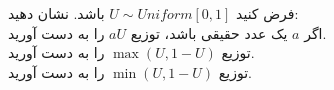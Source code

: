 \problem{}
فرض کنید \( U \sim {Uniform}[0, 1] \) باشد. نشان دهید:
\\
[5pt]
\subproblem{}
اگر \( a \) یک عدد حقیقی باشد، توزیع \( a U \) را به دست آورید.
\\
\subproblem{}
توزیع \( \max(U, 1 - U) \) را به دست آورید.
\\
\subproblem{}
توزیع \( \min(U, 1 - U) \) را به دست آورید.